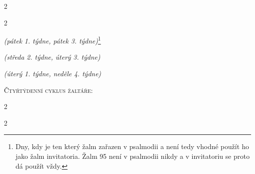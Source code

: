 \documentclass[a5paper, twoside]{article}
\newenvironment{hora}{
  \begin{multicols}{2}
}{
  \end{multicols}
}
\begin{document}
\begin{hora}

\columnbreak

\end{hora}


\begin{hora}
\label{zalm95}




{\footnotesize \noindent \textit{(pátek 1. týdne, pátek 3. týdne)}\footnote{
Dny, kdy je ten který žalm zařazen v psalmodii a není tedy vhodné použít ho
jako žalm invitatoria. Žalm 95 není v psalmodii nikdy a v invitatoriu se proto
dá použít vždy.}}



{\footnotesize \noindent \textit{(středa 2. týdne, úterý 3. týdne)}}



{\footnotesize \noindent \textit{(úterý 1. týdne, neděle 4. týdne)}}

\end{hora}

\clearpage

\begin{center}
{\LARGE \textsc{Čtyřtýdenní cyklus žaltáře:}}
\end{center}



\nesporyI
\begin{hora}


\label{kantfp2}

\end{hora}

\ranniChvaly
\begin{hora}
\label{zalmyne1trch}



\end{hora}
\end{document}
